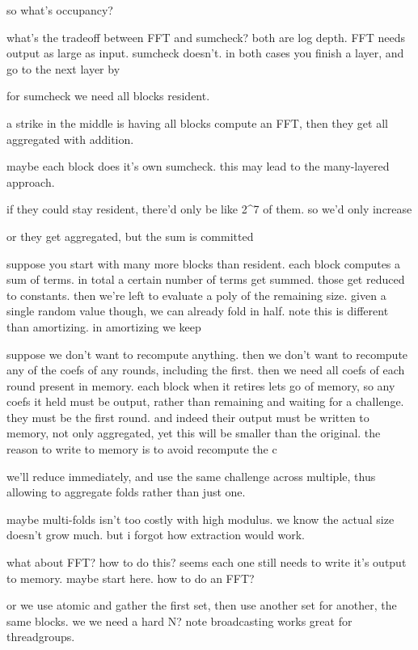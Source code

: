 


so what's occupancy?



what's the tradeoff between FFT and sumcheck?
both are log depth.
FFT needs output as large as input. sumcheck doesn't.
in both cases you finish a layer, and go to the next layer by 

for sumcheck we need all blocks resident. 

a strike in the middle is having all blocks compute an FFT, then they get all aggregated with addition. 

maybe each block does it's own sumcheck. 
this may lead to the many-layered approach. 

if they could stay resident, there'd only be like 2^7 of them. so we'd only increase 

or they get aggregated, but the sum is committed 

suppose you start with many more blocks than resident. 
each block computes a sum of terms.
in total a certain number of terms get summed. those get reduced to constants. then we're left to evaluate a poly of the remaining size. 
given a single random value though, we can already fold in half. note this is different than amortizing. in amortizing we keep

suppose we don't want to recompute anything. 
then we don't want to recompute any of the coefs of any rounds, including the first.
then we need all coefs of each round present in memory. 
each block when it retires lets go of memory, so any coefs it held must be output, rather than remaining and waiting for a challenge. they must be the first round.
and indeed their output must be written to memory, not only aggregated, yet this will be smaller than the original. the reason to write to memory is to avoid recompute the c

we'll reduce immediately, and use the same challenge across multiple, thus allowing to aggregate folds rather than just one. 

maybe multi-folds isn't too costly with high modulus. we know the actual size doesn't grow much. but i forgot how extraction would work.

what about FFT?
how to do this? seems each one still needs to write it's output to memory.
maybe start here. how to do an FFT?

or we use atomic and gather the first set, then use another set for another, the same blocks. 
we we need a hard N? 
note broadcasting works great for threadgroups.



